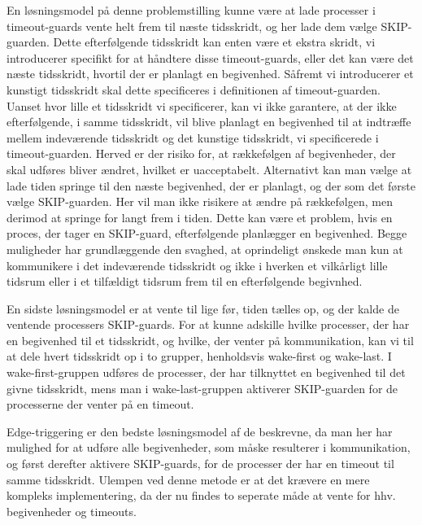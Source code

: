 En løsningsmodel på denne problemstilling kunne være at lade processer i timeout-guards vente helt frem til næste tidsskridt, og her lade dem vælge SKIP-guarden. Dette efterfølgende tidsskridt kan enten være et ekstra skridt, vi introducerer specifikt for at håndtere disse timeout-guards, eller det kan være det næste tidsskridt, hvortil der er planlagt en begivenhed. 
Såfremt vi introducerer et kunstigt tidsskridt skal dette specificeres i definitionen af timeout-guarden. Uanset hvor lille et tidsskridt vi specificerer, kan vi ikke garantere, at der ikke efterfølgende, i samme tidsskridt, vil blive planlagt en begivenhed til at indtræffe mellem indeværende tidsskridt og det kunstige tidsskridt, vi specificerede i timeout-guarden. Herved er der risiko for, at rækkefølgen af begivenheder, der skal udføres bliver ændret, hvilket er uacceptabelt. 
Alternativt kan man vælge at lade tiden springe til den næste begivenhed, der er planlagt, og der som det første vælge SKIP-guarden. Her vil man ikke risikere at ændre på rækkefølgen, men derimod at springe for langt frem i tiden. Dette kan være et problem, hvis en proces, der tager en SKIP-guard, efterfølgende planlægger en begivenhed.
Begge muligheder har grundlæggende den svaghed, at oprindeligt ønskede man kun at kommunikere i det indeværende tidsskridt og ikke i hverken et vilkårligt lille tidsrum eller i et tilfældigt tidsrum frem til en efterfølgende begivnhed.

En sidste løsningsmodel er at vente til lige før, tiden tælles op, og der kalde de ventende processers SKIP-guards. 
For at kunne adskille hvilke processer, der har en begivenhed til et tidsskridt, og hvilke, der venter på kommunikation, kan vi  til at dele hvert tidsskridt op i to grupper, henholdsvis wake-first og wake-last.
I wake-first-gruppen udføres de processer, der har tilknyttet en begivenhed til det givne tidsskridt, mens man i  wake-last-gruppen aktiverer SKIP-guarden for de processerne der venter på en timeout.

Edge-triggering er den bedste løsningsmodel af de beskrevne, da man her har mulighed for at udføre alle begivenheder, som måske resulterer i kommunikation, og først derefter aktivere SKIP-guards, for de processer der har en timeout til samme tidsskridt. Ulempen ved denne metode er at det krævere en mere kompleks implementering, da der nu findes to seperate måde at vente for hhv. begivenheder og timeouts.


